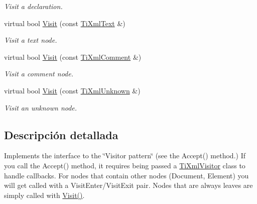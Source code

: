 \begin{DoxyCompactItemize}
\begin{DoxyCompactList}\small\item\em Visit a declaration. \end{DoxyCompactList}\item 
\hypertarget{class_ti_xml_visitor_a399b8ebca5cd14664974a32d2ce029e5}{virtual bool \hyperlink{class_ti_xml_visitor_a399b8ebca5cd14664974a32d2ce029e5}{Visit} (const \hyperlink{class_ti_xml_text}{Ti\-Xml\-Text} \&)}\label{class_ti_xml_visitor_a399b8ebca5cd14664974a32d2ce029e5}

\begin{DoxyCompactList}\small\item\em Visit a text node. \end{DoxyCompactList}\item 
\hypertarget{class_ti_xml_visitor_a53a60e7a528627b31af3161972cc7fa2}{virtual bool \hyperlink{class_ti_xml_visitor_a53a60e7a528627b31af3161972cc7fa2}{Visit} (const \hyperlink{class_ti_xml_comment}{Ti\-Xml\-Comment} \&)}\label{class_ti_xml_visitor_a53a60e7a528627b31af3161972cc7fa2}

\begin{DoxyCompactList}\small\item\em Visit a comment node. \end{DoxyCompactList}\item 
\hypertarget{class_ti_xml_visitor_a7e284d607d275c51dac1adb58159ce28}{virtual bool \hyperlink{class_ti_xml_visitor_a7e284d607d275c51dac1adb58159ce28}{Visit} (const \hyperlink{class_ti_xml_unknown}{Ti\-Xml\-Unknown} \&)}\label{class_ti_xml_visitor_a7e284d607d275c51dac1adb58159ce28}

\begin{DoxyCompactList}\small\item\em Visit an unknown node. \end{DoxyCompactList}\end{DoxyCompactItemize}


\subsection{Descripción detallada}
Implements the interface to the \char`\"{}\-Visitor pattern\char`\"{} (see the Accept() method.) If you call the Accept() method, it requires being passed a \hyperlink{class_ti_xml_visitor}{Ti\-Xml\-Visitor} class to handle callbacks. For nodes that contain other nodes (Document, Element) you will get called with a Visit\-Enter/\-Visit\-Exit pair. Nodes that are always leaves are simply called with \hyperlink{class_ti_xml_visitor_afad71c71ce6473fb9b4b64cd92de4a19}{Visit()}.

